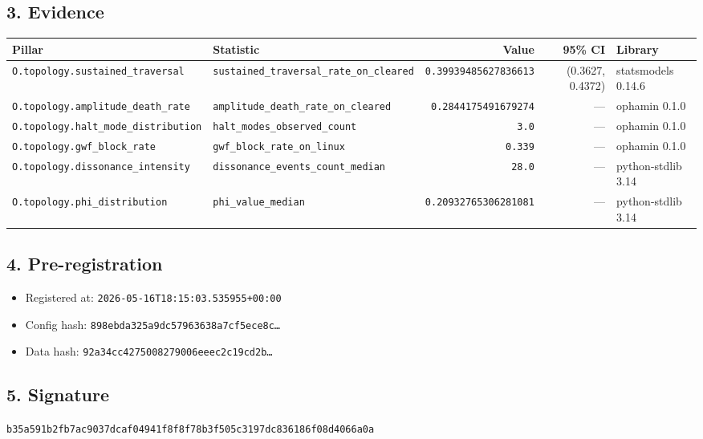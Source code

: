 \documentclass{article}
\begin{document}
\subsection*{3. Evidence}
\begin{tabular}{llrrl}\toprule
\textbf{Pillar} & \textbf{Statistic} & \textbf{Value} & \textbf{95\% CI} & \textbf{Library} \\\midrule
\texttt{O.topology.sustained\_traversal} & \texttt{sustained\_traversal\_rate\_on\_cleared} & \texttt{0.39939485627836613} & (0.3627, 0.4372) & statsmodels 0.14.6 \\
\texttt{O.topology.amplitude\_death\_rate} & \texttt{amplitude\_death\_rate\_on\_cleared} & \texttt{0.2844175491679274} & --- & ophamin 0.1.0 \\
\texttt{O.topology.halt\_mode\_distribution} & \texttt{halt\_modes\_observed\_count} & \texttt{3.0} & --- & ophamin 0.1.0 \\
\texttt{O.topology.gwf\_block\_rate} & \texttt{gwf\_block\_rate\_on\_linux} & \texttt{0.339} & --- & ophamin 0.1.0 \\
\texttt{O.topology.dissonance\_intensity} & \texttt{dissonance\_events\_count\_median} & \texttt{28.0} & --- & python-stdlib 3.14 \\
\texttt{O.topology.phi\_distribution} & \texttt{phi\_value\_median} & \texttt{0.20932765306281081} & --- & python-stdlib 3.14 \\
\bottomrule\end{tabular}
\subsection*{4. Pre-registration}
\begin{itemize}
\item Registered at: \texttt{2026-05-16T18:15:03.535955+00:00}
\item Config hash: \texttt{898ebda325a9dc57963638a7cf5ece8c\dots}
\item Data hash: \texttt{92a34cc4275008279006eeec2c19cd2b\dots}
\end{itemize}
\subsection*{5. Signature}
\texttt{b35a591b2fb7ac9037dcaf04941f8f8f78b3f505c3197dc836186f08d4066a0a}\\
\end{document}
